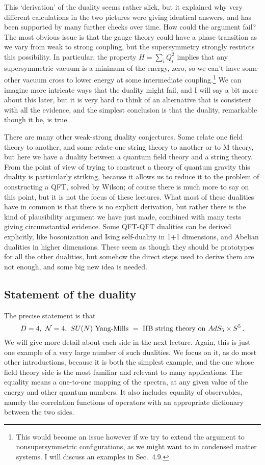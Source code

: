 \documentclass[12pt]{article}
\begin{document}
This `derivation' of the duality seems rather slick, but it explained why very different calculations in the two pictures were giving identical answers, and has been supported by many further checks over time.  How could the argument fail?  The most obvious issue is that the gauge theory could have a phase transition as we vary from weak to strong coupling, but the supersymmetry strongly restricts this possibility.  In particular, the property $H = \sum_i Q_i^2$ implies that any supersymmetric vacuum is a minimum of the energy, zero, so we can't have some other vacuum cross to lower energy at some intermediate coupling.\footnote{This would become an issue however if we try to extend the argument to nonsupersymmetric configurations, as we might want to in condensed matter systems.  I will discuss an examples in Sec.~4.9.}  
We can imagine more intricate ways that the duality might fail, and I will say a bit more about this later, but it is very hard to think of an alternative that is consistent with all the evidence, and the simplest conclusion is that the duality, remarkable though it be, is  true.

There are many other weak-strong duality conjectures.  Some relate one field theory to another, and some relate one string theory to another or to M theory, but here we have a duality between a quantum field theory and a string theory.  From the point of view of trying to construct a theory of quantum gravity this duality is particularly striking, because it allows us to reduce it to the problem of constructing a QFT, solved by Wilson; of course there is much more to say on this point, but it is not the focus of these lectures.  What most of these dualities have in common is that there is no explicit derivation, but rather there is the kind of plausibility argument we have just made, combined with many tests giving circumstantial evidence.  Some QFT-QFT dualities can be derived explicitly, like bosonization and Ising self-duality in 1+1 dimensions, and Abelian dualities in higher dimensions.  These seem as though they should be prototypes for all the other dualities, but somehow the direct steps used to derive them are not enough, and some big new idea is needed.

\subsection{Statement of the duality}

The precise statement is that 
\begin{equation}
D=4,\  {\cal N} = 4,\ SU(N)\ \mbox{Yang-Mills} \ =\ {\rm IIB\ string\ theory\ on}\ AdS_5 \times S^5 \,.
\end{equation}
We will give more detail about each side in the next lecture.  Again, this is just one example of a very large number of such dualities.  We focus on it, as do most other introductions, because it is both the simplest example, and the one whose field theory side is the most familiar and relevant to many applications.  The equality means a one-to-one mapping of the spectra, at any given value of the energy and other quantum numbers.  It also includes equality of observables, namely the correlation functions of operators with an appropriate dictionary between the two sides.
\end{document}
